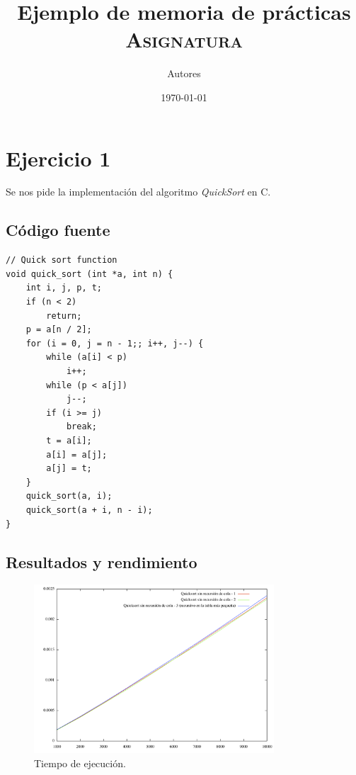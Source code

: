 \documentclass[12pt, a4paper, titlepage]{article}
\author{Autores}
\date{\today}
\title{Ejemplo de memoria de prácticas \\ {\large\textsc{Asignatura}}}
\begin{document}
\maketitle

\pagestyle{plain} %

\tableofcontents
\newpage

\section{Ejercicio 1}

Se nos pide la implementación del algoritmo \textit{QuickSort} en C.

\subsection{Código fuente}

\begin{lstlisting}
// Quick sort function
void quick_sort (int *a, int n) {
    int i, j, p, t;
    if (n < 2)
        return;
    p = a[n / 2];
    for (i = 0, j = n - 1;; i++, j--) {
        while (a[i] < p)
            i++;
        while (p < a[j])
            j--;
        if (i >= j)
            break;
        t = a[i];
        a[i] = a[j];
        a[j] = t;
    }
    quick_sort(a, i);
    quick_sort(a + i, n - i);
}
\end{lstlisting}


\subsection{Resultados y rendimiento}

\begin{figure}[hbtp]
\centering
\includegraphics[width = 0.8\textwidth]{Grafica.png}
\caption{Tiempo de ejecución.}
\label{fig:TiempoEjecucion}
\end{figure}
\end{document}
